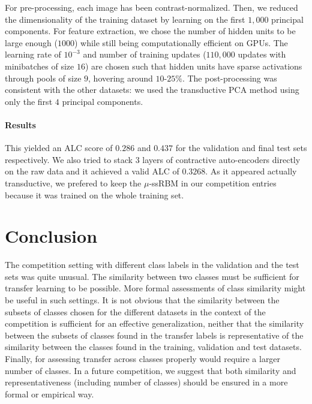 
For pre-processing, each image has been contrast-normalized. Then, we reduced the
dimensionality of the training dataset by learning on the first $1,000$
principal components. For feature extraction, we chose the number of hidden
units to be large enough ($1000$) while still being computationally efficient on GPUs.
The learning rate of $10^{-3}$ and number of training updates ($110,000$
updates with minibatches of size $16$) are chosen such that hidden units have
sparse activations through pools of size $9$, hovering around $10$-$25\%$.
The post-processing was consistent with the other datasets: we used the
transductive PCA method using only the first $4$ principal components.

\paragraph{Results}

This yielded an ALC score of $0.286$ and $0.437$ for the validation and final
test sets respectively. We also tried to stack $3$ layers of contractive
auto-encoders directly on the raw data and it achieved a valid ALC of
$0.3268$. As it appeared actually transductive, we prefered to keep the
$\mu$-ssRBM in our competition entries because it was trained on the whole
training set.


\section{Conclusion}

The competition setting with different class labels in the validation and the test sets
was quite unusual. The similarity between two classes must be sufficient for
transfer learning to be possible.  %
More formal assessments of class similarity might be useful in such settings.
It is not obvious that the similarity between the
subsets of classes chosen for the different datasets in the context of the
competition is sufficient for an effective generalization, neither that the
similarity between the subsets of classes found in the transfer labels is
representative of the similarity between the classes found in the training, validation
and test datasets.  Finally, for assessing transfer across classes properly
would require a larger number of classes. 
In a future competition, we suggest that both similarity
and representativeness (including number of classes)
should be ensured in a more formal or empirical way.

